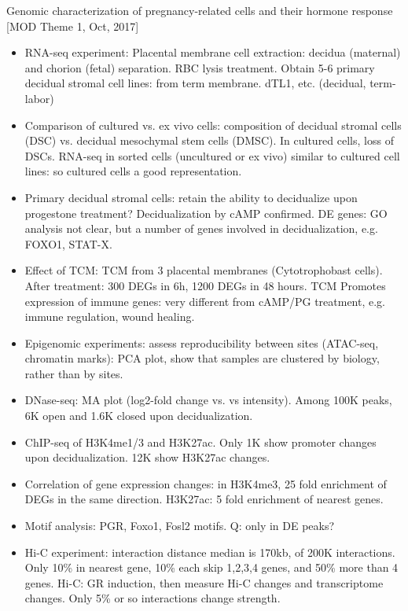 \documentclass{report}
\begin{document}
Genomic characterization of pregnancy-related cells and their hormone response [MOD Theme 1, Oct, 2017]
\begin{itemize}
	\item RNA-seq experiment: Placental membrane cell extraction: decidua (maternal) and chorion (fetal) separation. RBC lysis treatment. Obtain 5-6 primary decidual stromal cell lines: from term membrane. dTL1, etc. (decidual, term-labor)
	
	\item Comparison of cultured vs. ex vivo cells: composition of decidual stromal cells (DSC) vs. decidual mesochymal stem cells (DMSC). In cultured cells, loss of DSCs. RNA-seq in sorted cells (uncultured or ex vivo) similar to cultured cell lines: so cultured cells a good representation.
	
	\item Primary decidual stromal cells: retain the ability to decidualize upon progestone treatment? Decidualization by cAMP confirmed. DE genes: GO analysis not clear, but a number of genes involved in decidualization, e.g. FOXO1, STAT-X.
	
	\item Effect of TCM: TCM from 3 placental membranes (Cytotrophobast cells). After treatment: 300 DEGs in 6h, 1200 DEGs in 48 hours. TCM Promotes expression of immune genes: very different from cAMP/PG treatment, e.g. immune regulation, wound healing.
	
	\item Epigenomic experiments: assess reproducibility between sites (ATAC-seq, chromatin marks): PCA plot, show that samples are clustered by biology, rather than by sites.
	
	\item DNase-seq: MA plot (log2-fold change vs. vs intensity). Among 100K peaks, 6K open and 1.6K closed upon decidualization.
	
	\item ChIP-seq of H3K4me1/3 and H3K27ac. Only 1K show promoter changes upon decidualization. 12K show H3K27ac changes.
	
	\item Correlation of gene expression changes: in H3K4me3, 25 fold enrichment of DEGs in the same direction. H3K27ac: 5 fold enrichment of nearest genes.
	
	\item Motif analysis: PGR, Foxo1, Fosl2 motifs. Q: only in DE peaks?
	
	\item Hi-C experiment: interaction distance median is 170kb, of 200K interactions. Only 10\% in nearest gene, 10\% each skip 1,2,3,4 genes, and 50\% more than 4 genes. Hi-C: GR induction, then measure Hi-C changes and transcriptome changes. Only 5\% or so interactions change strength.
	

\end{itemize}
\end{document}
